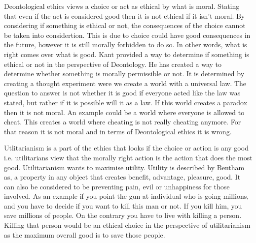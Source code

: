 Deontological ethics views a choice or act as ethical by what is moral. Stating that even if the act is considered good then it is not ethical if it isn't moral. By considering if something is ethical or not, the consequences of the choice cannot be taken into considertion. This is due to choice could have good consequences in the future, however it is still morally forbidden to do so. In other words, what is right comes over what is good. 
Kant provided a way to determine if something is ethical or not in the perspective of Deontology. He has created a way to determine whether something is morally permissible or not. It is determined by creating a thought experiment were we create a world with a universal law. The question to answer is not whether it is good if everyone acted like the law was stated, but rather if it is possible will it as a law. If this world creates a paradox then it is not moral. An example could be a world where everyone is allowed to cheat. This creates a world where cheating is not really cheating anymore. For that reason it is not moral and in terms of Deontological ethics it is wrong.

Utlitarianism is a part of the ethics that looks if the choice or action is any good i.e. utilitarians view that the morally right action is the action that does the most good. Utilitarianism wants to maximise utility. Utility is described by Bentham as, a property in any object that creates benefit, advantage, pleasure, good. It can also be considered to be preventing pain, evil or unhappiness for those involved. As an example if you point the gun at individual who is going millions, and you have to decide if you want to kill this man or not. If you kill him, you save millions of people. On the contrary you have to live with killing a person. Killing that person would be an ethical choice in the perspective of utilitarianism as the maximum overall good is to save those people. 

